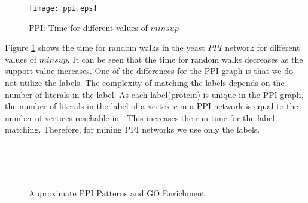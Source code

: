 \begin{figure}[!h]
	\centerline{
	\texttt{[image: ppi.eps]}
	}
    \caption{PPI: Time for different values of $minsup$}
    \label{fig:ppiwalks}
\end{figure}

\smallskip{} Figure \ref{fig:ppiwalks} shows
the time for random walks in the yeast $PPI$ network for different values of
$minsup$.  It can be seen that the time for random walks decreases as
the support value increases.  One of the differences for the PPI graph
is that we do not utilize the \khop labels.  The complexity of matching
the \khop labels depends on the number of literals in the \khop label.
As each label(protein) is unique in the PPI graph, the number of
literals in the \khop label of a vertex $v$ in a PPI network is equal to
the number of vertices reachable in \khops. This increases the run time
for the \khop label matching.  Therefore, for mining PPI networks we use
only the \ncl labels.


\begin{figure}[!ht]
  \\
 \\ 
  \\
    \caption{Approximate PPI Patterns and GO Enrichment}
    \label{fig:ppipats}
\end{figure}

